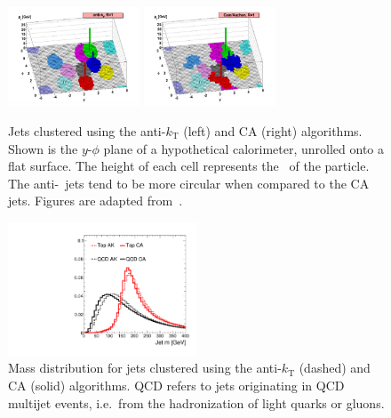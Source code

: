 \begin{figure}[]
    \begin{center}
        \includegraphics[width=0.35\textwidth]{figures/toptagging/gen/ak.png}
        \includegraphics[width=0.35\textwidth]{figures/toptagging/gen/ca.png}
        \caption{Jets clustered using the anti-$k_\mathrm{T}$ (left) and CA (right) algorithms.
                 Shown is the $y$-$\phi$ plane of a hypothetical calorimeter, unrolled onto a flat surface.
                 The height of each cell represents the \pt~of the particle. 
                 The anti-\kt~jets tend to be more circular when compared to the CA jets.
                 Figures are adapted from~\needcite.}
        \label{fig:jets:algos}
    \end{center}
\end{figure}

\begin{figure}[]
    \begin{center}
        \includegraphics[width=0.5\textwidth]{figures/toptagging/gen/clf_M.pdf}
        \caption{Mass distribution for jets clustered using the anti-$k_\mathrm{T}$ (dashed) and CA (solid) algorithms.
                 QCD refers to jets originating in QCD multijet events, i.e.~from the hadronization of light quarks or gluons.}
        \label{fig:jets:caak}
    \end{center}
\end{figure}

